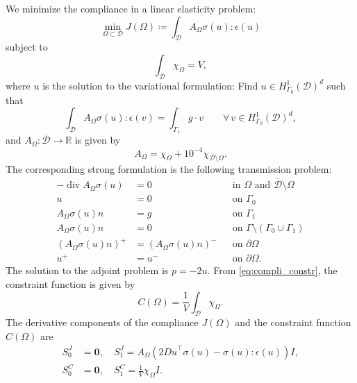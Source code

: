 \documentclass[iicol,pdflatex,sn-mathphys-ay]{sn-jnl}%
\theoremstyle{thmstyleone}%
\theoremstyle{thmstyletwo}%
\theoremstyle{thmstylethree}%
\begin{document}
We minimize the compliance in a linear elasticity problem:
\begin{equation} \label{eq:compli_cost}
	\min_{\Omega \subset \mathcal{D}}
	J(\Omega) \coloneqq \int_{\mathcal{D}} A_{\Omega}\sigma(u):\epsilon(u)
\end{equation}
subject to
\begin{equation}\label{eq:compli_constr}
	\int_{\mathcal{D}} \chi_{\Omega} = V,
\end{equation}
where $u$ is the solution to the variational formulation:
Find $u \in  H^1_{\Gamma_0}(\mathcal{D})^d$ such that
\begin{equation}\label{eq:compli_weak}
\int_{\mathcal{D}} A_{\Omega}\sigma(u)\colon\!\epsilon(v) =
	\int_{\Gamma_1} g\cdot v
\qquad
\forall \, v \in  H^1_{\Gamma_0}(\mathcal{D})^d,
\end{equation}
and $A_{\Omega}\colon\overline{\mathcal{D}}\to\mathds{R}$ is given by
\begin{equation}\label{eq:compli_AOmega}
	A_{\Omega} = \chi_{\Omega} + {10}^{-4}\chi_{\overline{\mathcal{D}}\setminus\Omega}.
\end{equation}
The corresponding strong formulation is the following transmission problem:
\begin{equation}\label{eq:compli_prob}
	\begin{aligned}
	   -\operatorname{div} A_{\Omega} \sigma(u) &= 0 && \text{in } \Omega \text{ and }\overline{\mathcal{D}}\setminus\Omega\\
											 u  &= 0 && \text{on } \Gamma_{0}\\
					     A_{\Omega} \sigma(u)n  &= g && \text{on } \Gamma_{1} \\
					     A_{\Omega} \sigma(u)n  &= 0 && \text{on } \Gamma \setminus (\Gamma_{0} \cup \Gamma_{1})	\\
				      (A_{\Omega} \sigma(u)n)^+ &= (A_{\Omega} \sigma(u)n)^- && \text{on }  \partial\Omega\\      
						                    u^+ &= u^- && \text{on } \partial\Omega   	.				 
	\end{aligned}
\end{equation}
The solution to the adjoint problem is $p=-2u$.
From \eqref{eq:compli_constr}, the constraint function is given by
\begin{equation*}
	C(\Omega) = \frac{1}{V} \int_{\mathcal{D}} \chi_{\Omega}.
\end{equation*} 
The derivative components of the compliance $J(\Omega)$ and the constraint function $C(\Omega)$ are
\begin{align*}
	S^J_0 &= \boldsymbol{0} ,\quad S^J_1 = A_{\Omega} (2{Du}^{\top}\sigma(u)- \sigma(u):\epsilon(u))I,\\
	S^C_0 &= \boldsymbol{0},\quad S^C_1 = \frac{1}{V} \chi_\Omega I.
\end{align*}
\end{document}
